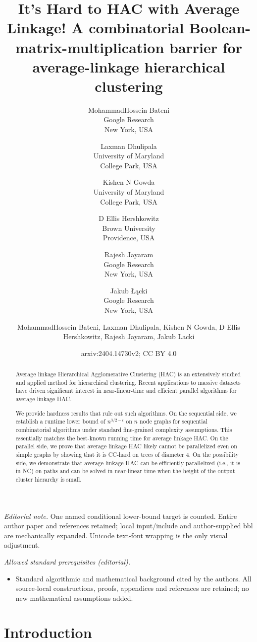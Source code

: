 \documentclass[11pt]{article}
\title{
It's Hard to HAC with Average Linkage!
}
\author{%
MohammadHossein Bateni\\%
Google Research\\%
New York, USA%
\and%
Laxman Dhulipala\\%
University of Maryland\\%
College Park, USA%
\and%
Kishen N Gowda\\%
University of Maryland\\
College Park, USA%
\and%
D Ellis Hershkowitz\\%
Brown University\\
Providence, USA%
\and%
Rajesh Jayaram\\%
Google Research\\
New York, USA%
\and%
Jakub Łącki\\%
Google Research\\
New York, USA%
}
\date{}
\title{A combinatorial Boolean-matrix-multiplication barrier for average-linkage hierarchical clustering}
\author{MohammadHossein Bateni, Laxman Dhulipala, Kishen N Gowda, D Ellis Hershkowitz, Rajesh Jayaram, Jakub Lacki}
\date{arxiv:2404.14730v2; CC BY 4.0}
\begin{document}
\maketitle
\noindent\textit{Editorial note.} One named conditional lower-bound target is counted. Entire author paper and references retained; local input/include and author-supplied bbl are mechanically expanded. Unicode text-font wrapping is the only visual adjustment.\par\medskip
\noindent\textit{Allowed standard prerequisites (editorial).}\begin{itemize}
\item Standard algorithmic and mathematical background cited by the authors. All source-local constructions, proofs, appendices and references are retained; no new mathematical assumptions added.
\end{itemize}\medskip

\begin{abstract}
Average linkage Hierarchical Agglomerative Clustering (HAC) is an extensively studied and applied method for hierarchical clustering. Recent applications to massive datasets have driven significant interest in near-linear-time and efficient parallel algorithms for average linkage HAC.

We provide hardness results that rule out such algorithms. On the sequential side, we establish a runtime lower bound of $n^{3/2-\epsilon}$ on $n$ node graphs for sequential combinatorial algorithms under standard fine-grained complexity assumptions. This essentially matches the best-known running time for average linkage HAC. On the parallel side, we prove that average linkage HAC likely cannot be parallelized even on simple graphs by showing that it is CC-hard on trees of diameter $4$. On the possibility side, we demonstrate that average linkage HAC can be efficiently parallelized (i.e., it is in NC) on paths and can be solved in near-linear time when the height of the output cluster hierarchy is small.
\end{abstract}
\thispagestyle{empty}
\newpage
\setcounter{page}{1}

\section{Introduction}
\end{document}
